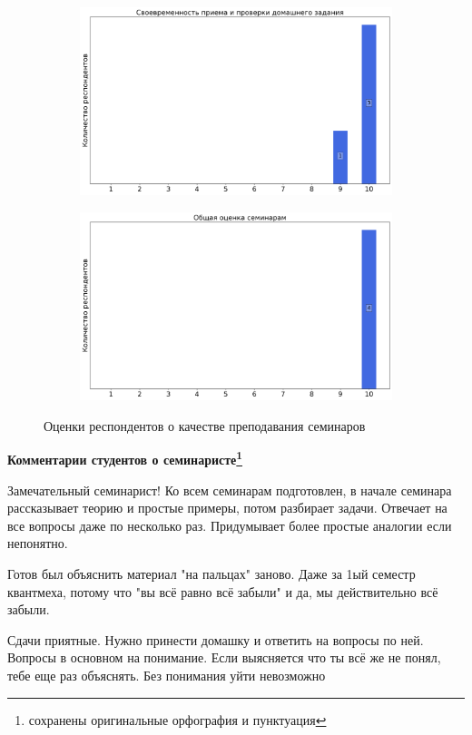 \begin{figure}[H]
\begin{subfigure}[b]{0.45\textwidth}
                \includegraphics[width=\textwidth]{images/4 course/Квантовая механика/seminarists-marks-Садеков Д.И.-2.png}
            \end{subfigure}
            \begin{subfigure}[b]{0.45\textwidth}
                \centering
                \includegraphics[width=\textwidth]{images/4 course/Квантовая механика/seminarists-marks-Садеков Д.И.-3.png}
            \end{subfigure}	
            \caption{Оценки респондентов о качестве преподавания семинаров}
        \end{figure}

        \textbf{Комментарии студентов о семинаристе\protect\footnote{сохранены оригинальные орфография и пунктуация}}
            \begin{commentbox} 
                Замечательный семинарист!
                Ко всем семинарам подготовлен, в начале семинара рассказывает теорию и простые примеры, потом разбирает задачи. Отвечает на все вопросы даже по несколько раз. Придумывает более простые аналогии если непонятно. 
        
                Готов был объяснить материал "на пальцах" заново. Даже за 1ый семестр квантмеха, потому что "вы всё равно всё забыли" и да, мы действительно всё забыли. 
        
                Сдачи приятные. Нужно принести домашку и ответить на вопросы по ней. Вопросы в основном на понимание. Если выясняется что ты всё же не понял, тебе  еще раз объяснять. Без понимания уйти невозможно 
            \end{commentbox} 


